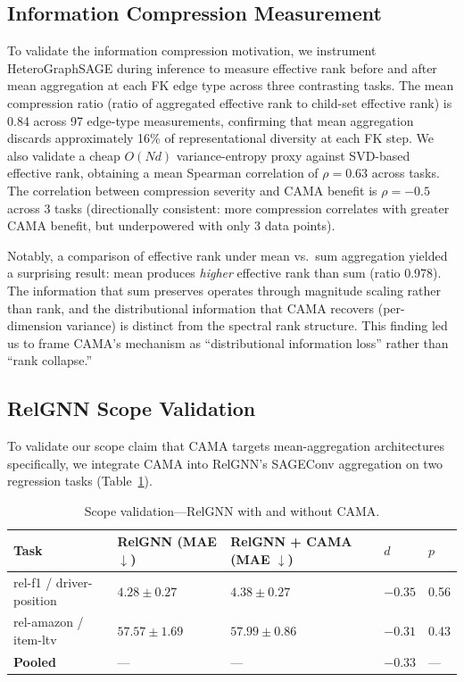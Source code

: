 \documentclass[11pt,letterpaper]{article}
\begin{document}
\subsection{Information Compression Measurement}
\label{sec:compression}

To validate the information compression motivation, we instrument HeteroGraphSAGE during inference to measure effective rank before and after mean aggregation at each FK edge type across three contrasting tasks. The mean compression ratio (ratio of aggregated effective rank to child-set effective rank) is 0.84 across 97 edge-type measurements, confirming that mean aggregation discards approximately 16\% of representational diversity at each FK step. We also validate a cheap $O(Nd)$ variance-entropy proxy against SVD-based effective rank, obtaining a mean Spearman correlation of $\rho = 0.63$ across tasks. The correlation between compression severity and CAMA benefit is $\rho = -0.5$ across 3 tasks (directionally consistent: more compression correlates with greater CAMA benefit, but underpowered with only 3 data points).

Notably, a comparison of effective rank under mean vs.\ sum aggregation yielded a surprising result: mean produces \emph{higher} effective rank than sum (ratio 0.978). The information that sum preserves operates through magnitude scaling rather than rank, and the distributional information that CAMA recovers (per-dimension variance) is distinct from the spectral rank structure. This finding led us to frame CAMA's mechanism as ``distributional information loss'' rather than ``rank collapse.''

\subsection{RelGNN Scope Validation}
\label{sec:relgnn}

To validate our scope claim that CAMA targets mean-aggregation architectures specifically, we integrate CAMA into RelGNN's \citep{Chen2025} SAGEConv aggregation on two regression tasks (Table~\ref{tab:relgnn}).

\begin{table}[!htbp]
\centering
\caption{Scope validation---RelGNN with and without CAMA.}
\label{tab:relgnn}
\small
\begin{tabular}{@{}lllll@{}}
\toprule
Task & RelGNN (MAE $\downarrow$) & RelGNN + CAMA (MAE $\downarrow$) & $d$ & $p$ \\
\midrule
rel-f1 / driver-position & $4.28 \pm 0.27$ & $4.38 \pm 0.27$ & $-0.35$ & 0.56 \\
rel-amazon / item-ltv & $57.57 \pm 1.69$ & $57.99 \pm 0.86$ & $-0.31$ & 0.43 \\
\midrule
\textbf{Pooled} & --- & --- & $\mathbf{-0.33}$ & --- \\
\bottomrule
\end{tabular}
\end{table}
\end{document}
